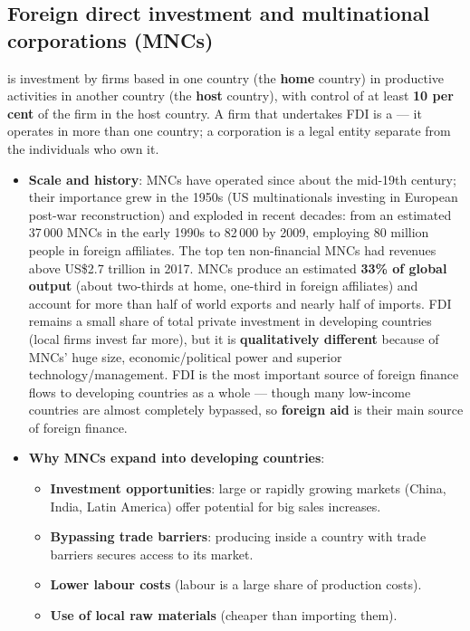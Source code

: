 \subsection{Foreign direct investment and multinational corporations (MNCs)}
 is investment by firms based in one country (the \textbf{home} country) in productive activities in another country (the \textbf{host} country), with control of at least \textbf{10 per cent} of the firm in the host country. A firm that undertakes FDI is a  --- it operates in more than one country; a corporation is a legal entity separate from the individuals who own it.
\begin{itemize}
  \item \textbf{Scale and history}: MNCs have operated since about the mid-19th century; their importance grew in the 1950s (US multinationals investing in European post-war reconstruction) and exploded in recent decades: from an estimated 37\,000 MNCs in the early 1990s to 82\,000 by 2009, employing 80 million people in foreign affiliates. The top ten non-financial MNCs had revenues above US\$2.7 trillion in 2017. MNCs produce an estimated \textbf{33\% of global output} (about two-thirds at home, one-third in foreign affiliates) and account for more than half of world exports and nearly half of imports. FDI remains a small share of total private investment in developing countries (local firms invest far more), but it is \textbf{qualitatively different} because of MNCs' huge size, economic/political power and superior technology/management. FDI is the most important source of foreign finance flows to developing countries as a whole --- though many low-income countries are almost completely bypassed, so \textbf{foreign aid} is their main source of foreign finance.
  \item \textbf{Why MNCs expand into developing countries}:
  \begin{itemize}
    \item \textbf{Investment opportunities}: large or rapidly growing markets (China, India, Latin America) offer potential for big sales increases.
    \item \textbf{Bypassing trade barriers}: producing inside a country with trade barriers secures access to its market.
    \item \textbf{Lower labour costs} (labour is a large share of production costs).
    \item \textbf{Use of local raw materials} (cheaper than importing them).

\end{itemize}
\end{itemize}
